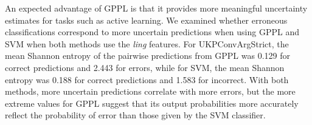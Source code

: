 % 


An expected advantage of GPPL is that it provides more meaningful uncertainty estimates for tasks such as active learning. 
We examined whether erroneous classifications correspond to more uncertain predictions
when using GPPL and SVM when both methods use the \emph{ling} features.
For UKPConvArgStrict, the mean Shannon entropy
of the pairwise predictions from GPPL 
was 0.129 for correct predictions and 2.443 for errors,
while for SVM, the mean Shannon entropy was  0.188 for correct predictions and 
1.583 for incorrect.
With both methods, more uncertain predictions correlate with more errors,
but the more extreme values for GPPL suggest that its output probabilities more 
accurately reflect the probability of error than those given by the SVM classifier.

